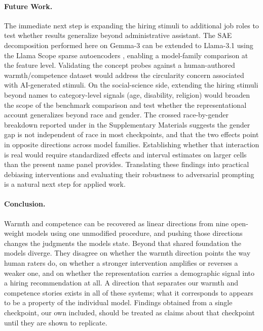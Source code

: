 \documentclass[twocolumn]{article}
\begin{document}
\balance
\paragraph{Future Work.}
The immediate next step is expanding the hiring stimuli to additional
job roles to test whether results generalize beyond administrative
assistant.
The SAE decomposition performed here on Gemma-3 can be extended to
Llama-3.1 using the Llama Scope sparse autoencoders \citep{lindsey2025llama},
enabling a model-family comparison at the feature level.
Validating the concept probes against a human-authored warmth/competence
dataset would address the circularity concern associated with
AI-generated stimuli.
On the social-science side, extending the hiring stimuli beyond names to
category-level signals (age, disability, religion) would broaden the
scope of the benchmark comparison and test whether the representational
account generalizes beyond race and gender.
The crossed race-by-gender breakdown reported under
 in the Supplementary Materials
suggests the gender gap is not independent of race in most checkpoints, and
that the two effects point in opposite directions across model families.
Establishing whether that interaction is real would require standardized
effects and interval estimates on larger cells than the present name panel
provides.
Translating these findings into practical debiasing interventions and
evaluating their robustness to adversarial prompting is a natural next
step for applied work.

\paragraph{Conclusion.}
Warmth and competence can be recovered as linear directions from nine
open-weight models using one unmodified procedure, and pushing those
directions changes the judgments the models state. Beyond that shared
foundation the models diverge. They disagree on whether the warmth direction
points the way human raters do, on whether a stronger intervention amplifies
or reverses a weaker one, and on whether the representation carries a
demographic signal into a hiring recommendation at all. A direction that
separates our warmth and competence stories exists in all of these systems;
what it corresponds to appears to be a property of the individual model.
Findings obtained from a single checkpoint, our own included, should be
treated as claims about that checkpoint until they are shown to replicate.
\end{document}
